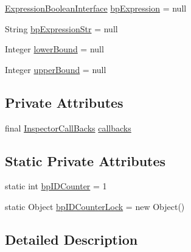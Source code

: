 \begin{DoxyCompactItemize}
\hyperlink{interfacegov_1_1nasa_1_1jpf_1_1inspector_1_1server_1_1expression_1_1_expression_boolean_interface}{Expression\+Boolean\+Interface} \hyperlink{classgov_1_1nasa_1_1jpf_1_1inspector_1_1server_1_1breakpoints_1_1_internal_breakpoint_holder_a67bbb21cd50adbff9c0e2a12ecd7ed66}{bp\+Expression} = null
\item 
String \hyperlink{classgov_1_1nasa_1_1jpf_1_1inspector_1_1server_1_1breakpoints_1_1_internal_breakpoint_holder_a97465a35e79135a7ecb6da72d004cc15}{bp\+Expression\+Str} = null
\item 
Integer \hyperlink{classgov_1_1nasa_1_1jpf_1_1inspector_1_1server_1_1breakpoints_1_1_internal_breakpoint_holder_ae884e78a734be2e3d219243eb2b3aa12}{lower\+Bound} = null
\item 
Integer \hyperlink{classgov_1_1nasa_1_1jpf_1_1inspector_1_1server_1_1breakpoints_1_1_internal_breakpoint_holder_a312bda6a263d1daad8dc3fd937d96169}{upper\+Bound} = null
\end{DoxyCompactItemize}
\subsection*{Private Attributes}
\begin{DoxyCompactItemize}
\item 
final \hyperlink{interfacegov_1_1nasa_1_1jpf_1_1inspector_1_1interfaces_1_1_inspector_call_backs}{Inspector\+Call\+Backs} \hyperlink{classgov_1_1nasa_1_1jpf_1_1inspector_1_1server_1_1breakpoints_1_1_internal_breakpoint_holder_aa5c3ad78995fd032dbbb96d53b8b3839}{callbacks}
\end{DoxyCompactItemize}
\subsection*{Static Private Attributes}
\begin{DoxyCompactItemize}
\item 
static int \hyperlink{classgov_1_1nasa_1_1jpf_1_1inspector_1_1server_1_1breakpoints_1_1_internal_breakpoint_holder_a19facb332603c82c6543adfe66432401}{bp\+I\+D\+Counter} = 1
\item 
static Object \hyperlink{classgov_1_1nasa_1_1jpf_1_1inspector_1_1server_1_1breakpoints_1_1_internal_breakpoint_holder_a3632bae772c7aa70e68938a266aaa062}{bp\+I\+D\+Counter\+Lock} = new Object()
\end{DoxyCompactItemize}


\subsection{Detailed Description}


